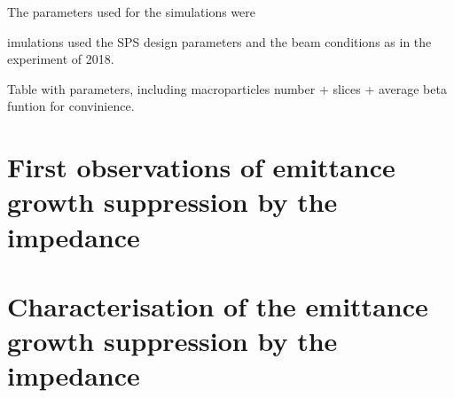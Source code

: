 The parameters used for the simulations were

imulations used the SPS design parameters and the beam conditions as in the experiment of 2018.

Table with parameters, including macroparticles number + slices + average beta funtion for convinience.




\section{First observations of emittance growth suppression by the impedance}


\section{Characterisation of the emittance growth suppression by the impedance}
